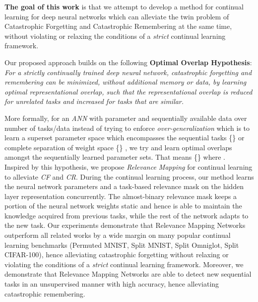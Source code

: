 \documentclass{article}
\begin{document}
\textbf{The goal of this work} is that we attempt to develop a method for continual learning for deep neural networks which can alleviate the twin problem of Catastrophic Forgetting and Catastrophic Remembering at the same time, without violating or relaxing the conditions of a \textit{strict} continual learning framework.

Our proposed approach builds on the following \textbf{Optimal Overlap Hypothesis}:
 \textit{For a strictly continually trained deep neural network, 
catastrophic forgetting and remembering can be minimized, without additional memory or data, by learning optimal representational overlap, such that the representational overlap is reduced for unrelated tasks and increased for tasks that are similar.}\par
More formally, for an \textit{ANN}  with parameter  and sequentially available data  over number of tasks/data  instead of trying to enforce \textit{over-generalization} which is to learn a superset parameter space which encompasses the sequential tasks \{\} or complete separation of weight space \{\} 
, we try and learn optimal overlaps amongst the sequentially learned parameter sets. That means \{\} where .\\
Inspired by this hypothesis, we propose \textit{Relevance Mapping} for continual learning to alleviate \textit{CF} and \textit{CR}. 
During the continual learning process, our method learns the neural network parameters and a task-based relevance mask on the hidden layer representation concurrently. The almost-binary relevance mask keeps a portion of the neural network weights static and hence is able to maintain the knowledge acquired from previous tasks, while the rest of the network adapts to the new task.
Our experiments demonstrate that Relevance Mapping Networks outperform all related works by a wide margin on many popular continual learning benchmarks (Permuted MNIST, Split MNIST, Split Omniglot, Split CIFAR-100), hence alleviating catastrophic forgetting without relaxing or violating the conditions of a \textit{strict} continual learning framework.
Moreover, we demonstrate that Relevance Mapping Networks are able to detect new sequential tasks in an unsupervised manner with high accuracy, hence alleviating catastrophic remembering.
\\
\end{document}
